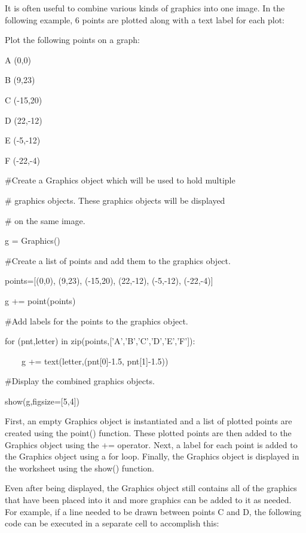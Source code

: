 \documentclass[12pt,oneside]{book}
\begin{document}
It is often useful to combine various kinds of graphics into one image. In the following example, 6 points are plotted along with a text label for each plot:

{\textquotedbl}{\textquotedbl}{\textquotedbl}

Plot the following points on a graph:


A (0,0)

B (9,23)

C ({}-15,20)

D (22,{}-12)

E ({}-5,{}-12)

F ({}-22,{}-4)

{\textquotedbl}{\textquotedbl}{\textquotedbl}


\#Create a Graphics object which will be used to hold multiple 

\# graphics objects. These graphics objects will be displayed

\# on the same image.

g = Graphics()


\#Create a list of points and add them to the graphics object.

points=[(0,0), (9,23), ({}-15,20), (22,{}-12), ({}-5,{}-12),
({}-22,{}-4)]

g += point(points)


\#Add labels for the points to the graphics object.

for (pnt,letter) in zip(points,['A','B','C','D','E','F']):

\ \ \ \ g += text(letter,(pnt[0]{}-1.5, pnt[1]{}-1.5))


\#Display the combined graphics objects.

show(g,figsize=[5,4])

{\textbar}


First, an empty Graphics object is instantiated and a list of plotted points are created using the point() function. These plotted points are then added to the Graphics object using the += operator. Next, a label for each point is added to the Graphics object using a for loop. Finally, the Graphics object is displayed in the worksheet using the show() function. 

Even after being displayed, the Graphics object still contains all of the graphics that have been placed into it and more graphics can be added to it as needed. For example, if a line needed to be drawn between points C and D, the following code can be executed in a separate cell to accomplish this: 
\end{document}
